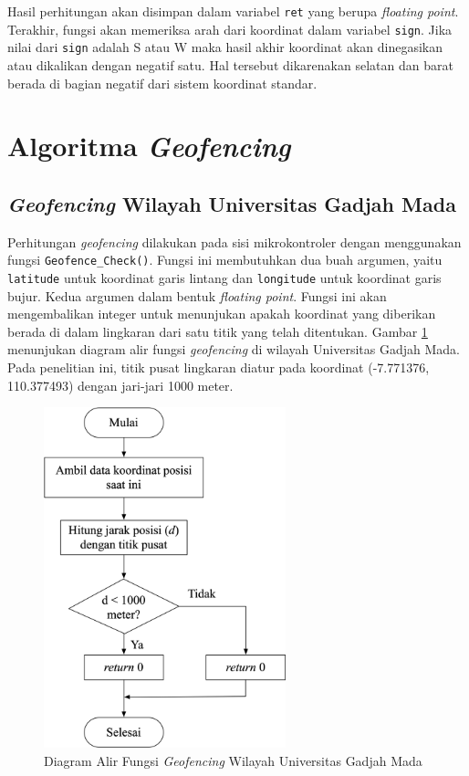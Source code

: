 Hasil perhitungan akan disimpan dalam variabel \texttt{ret} yang berupa \textit{floating point}. Terakhir, fungsi akan memeriksa arah dari koordinat dalam variabel \texttt{sign}. Jika nilai dari \texttt{sign} adalah S atau W maka hasil akhir koordinat akan dinegasikan atau dikalikan dengan negatif satu. Hal tersebut dikarenakan selatan dan barat berada di bagian negatif dari sistem koordinat standar.

\section{Algoritma \textit{Geofencing}}
\subsection{\textit{Geofencing} Wilayah Universitas Gadjah Mada}

Perhitungan \textit{geofencing} dilakukan pada sisi mikrokontroler dengan menggunakan fungsi \texttt{Geofence\_Check()}. Fungsi ini membutuhkan dua buah argumen, yaitu \texttt{latitude} untuk koordinat garis lintang dan \texttt{longitude} untuk koordinat garis bujur. Kedua argumen dalam bentuk \textit{floating point}. Fungsi ini akan mengembalikan integer untuk menunjukan apakah koordinat yang diberikan berada di dalam lingkaran dari satu titik yang telah ditentukan. Gambar \ref{Fig: flowchart-geofencing-ugm} menunjukan diagram alir fungsi \textit{geofencing} di  wilayah Universitas Gadjah Mada. Pada penelitian ini, titik pusat lingkaran diatur pada koordinat (-7.771376, 110.377493) dengan jari-jari 1000 meter.

\begin{figure}[H]
	\centering
	\includegraphics[width=7cm]{contents/chapter-3/flowchart-geofencing-ugm.png}
	\caption{Diagram Alir Fungsi \textit{Geofencing} Wilayah Universitas Gadjah Mada}
	\label{Fig: flowchart-geofencing-ugm}
\end{figure}

